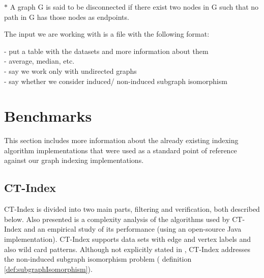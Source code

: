 \documentclass{l4proj}
\theoremstyle{definition}
\begin{document}
\small{$*$ A graph G is said to be disconnected if there exist two nodes in G such that no path in G has those nodes as endpoints.}

    The input we are working with is a file with the following format:\newline
    
    - put a table with the datasets and more information about them \\ 
    - average, median, etc. \\
    - say we work only with undirected graphs \\
    - say whether we consider induced/ non-induced subgraph isomorphism \\
    
\section{Benchmarks} %
This section includes more information about the already existing indexing algorithm implementations that were used as a standard point of reference against our graph indexing implementations. 

%
%
%

\subsection{CT-Index}
CT-Index \cite{ctindex} is divided into two main parts, filtering and verification, both described below. Also presented is a complexity analysis of the algorithms used by CT-Index and an empirical study of its performance (using an open-source Java implementation).
CT-Index supports data sets with edge and vertex labels and also wild card patterns. Although not explicitly stated in \cite{ctindex}, CT-Index addresses the non-induced subgraph isomorphism problem  ( definition \ref{def:subgraphIsomorphism}).
\end{document}
